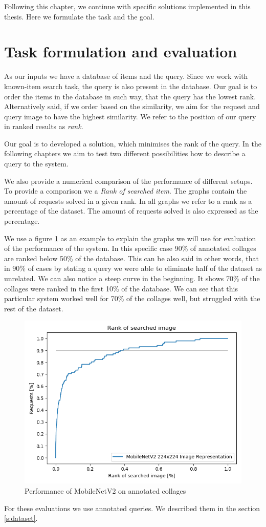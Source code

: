 Following this chapter, we continue with specific solutions implemented in this thesis. Here we formulate the task and the goal.

\section*{Task formulation and evaluation}

As our inputs we have a database of items and the query. Since we work with known-item search task, the query is also present in the database. Our goal is to order the items in the database in such way, that the query has the lowest rank. Alternatively said, if we order based on the similarity, we aim for the request and query image to have the highest similarity. We refer to the position of our query in ranked results as \emph{rank}.

Our goal is to developed a solution, which minimises the rank of the query. In the following chapters we aim to test two different possibilities how to describe a query to the system.

We also provide a numerical comparison of the performance of different setups. To provide a comparison we a \emph{Rank of searched item}. The graphs contain the amount of requests solved in a given rank. In all graphs we refer to a rank as a percentage of the dataset. The amount of requests solved is also expressed as the percentage.

We use a figure \ref{fig:mobilenet_whole_image_example} as an example to explain the graphs we will use for evaluation of the performance of the system. In this specific case 90\% of annotated collages are ranked below 50\% of the database. This can be also said in other words, that in 90\% of cases by stating a query we were able to eliminate half of the dataset as unrelated. We can also notice a steep curve in the beginning. It shows 70\% of the collages were ranked in the first 10\% of the database. We can see that this particular system worked well for 70\% of the collages well, but struggled with the rest of the dataset.

\begin{figure}
    \centering
    \includegraphics[width=0.8\linewidth]{img/mobilenet_whole_image.png}
    \caption{Performance of MobileNetV2 on annotated collages}
    \label{fig:mobilenet_whole_image_example}
\end{figure}

For these evaluations we use annotated queries. We described them in the section \ref{s:dataset}.